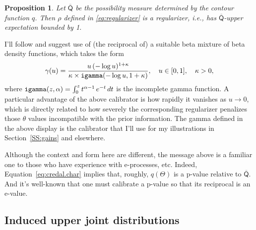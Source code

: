 \documentclass[a4paper, 12pt]{article}
\theoremstyle{plain}
\newtheorem{prop}{Proposition}
\theoremstyle{definition}
\theoremstyle{remark}
\newcommand{\uprior}{\overline{\mathsf{Q}}}
\begin{document}
\begin{prop}
\label{prop:prior.reg}
Let $\uprior$ be the possibility measure determined by the contour function $q$.  Then $\rho$ defined in \eqref{eq:regularizer} is a regularizer, i.e., has $\uprior$-upper expectation bounded by 1.
\end{prop}


I'll follow \citet[][Appendix~B]{vovk.wang.2021} and suggest use of (the reciprocal of) a suitable beta mixture of beta density functions, which takes the form 
\[ \gamma(u) = \frac{u \, (-\log u)^{1 + \kappa}}{\kappa \times {\tt igamma}(-\log u, 1 + \kappa)}, \quad u \in [0,1], \quad \kappa > 0, \]
where ${\tt igamma}(z, \alpha) = \int_0^z t^{\alpha-1} \, e^{-t} \, dt$ is the incomplete gamma function. A particular advantage of the above calibrator is how rapidly it vanishes as $u \to 0$, which is directly related to how severely the corresponding regularizer penalizes those $\theta$ values incompatible with the prior information.  The gamma defined in the above display is the calibrator that I'll use for my illustrations in Section~\ref{SS:gains} and elsewhere.  

Although the context and form here are different, the message above is a familiar one to those who have experience with e-processes, etc.  Indeed, Equation~\eqref{eq:credal.char} implies that, roughly, $q(\Theta)$ is a p-value relative to $\uprior$.  And it's well-known \citep[e.g.,][]{sellkebayarriberger2001, vovk1993} that one must calibrate a p-value so that its reciprocal is an e-value.  

 



\subsection{Induced upper joint distributions}
\label{SS:pullback}
\end{document}
